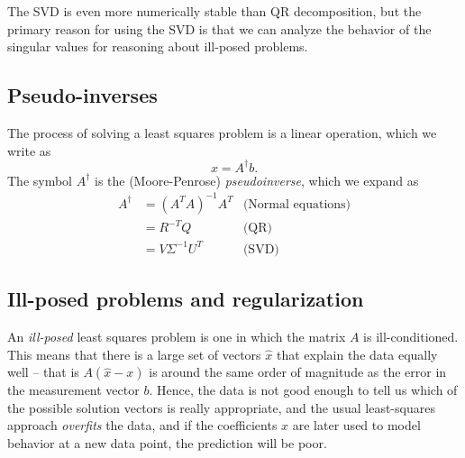 \documentclass[12pt, leqno]{article}
\begin{document}
The SVD is even more numerically stable than QR decomposition,
but the primary reason for using the SVD is that we can analyze
the behavior of the singular values for reasoning about ill-posed
problems.

\subsection{Pseudo-inverses}

The process of solving a least squares problem is a linear operation,
which we write as
\[
  x = A^\dagger b.
\]
The symbol $A^\dagger$ is the (Moore-Penrose) {\em pseudoinverse},
which we expand as
\begin{align*}
  A^\dagger
  &= (A^T A)^{-1} A^T & \mbox{(Normal equations)} \\
  &= R^{-T} Q & \mbox{(QR)} \\
  &= V \Sigma^{-1} U^T & \mbox{(SVD)}
\end{align*}

\subsection{Ill-posed problems and regularization}

An {\em ill-posed} least squares problem is one in which the matrix
$A$ is ill-conditioned.  This means that there is a large set of
vectors $\hat{x}$ that explain the data equally well -- that is
$A(\hat{x}-x)$ is around the same order of magnitude as the
error in the measurement vector $b$.  Hence, the data is not good
enough to tell us which of the possible solution vectors is
really appropriate, and the usual least-squares approach
{\em overfits} the data, and if the coefficients $x$ are later used
to model behavior at a new data point, the prediction will be poor.
\end{document}
